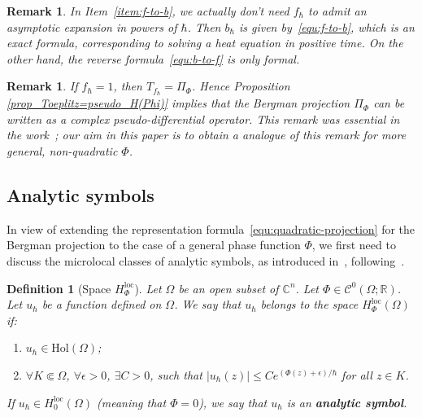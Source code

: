 \documentclass{article}
\newtheorem{defi}[theo]{Definition}
\newtheorem{remark}[theo]{Remark}
\newcommand{\Hol}{\mathrm{Hol}}
\newcommand{\loc}{\mathrm{loc}}
\newcommand{\CM}{\mathbb{C}}
\newcommand{\h}{\hbar}
\begin{document}
\begin{remark}
  In Item~\ref{item:f-to-b}, we actually don't need $f_\h$ to admit an
  asymptotic expansion in powers of $\h$. Then $b_\h$ is given
  by~\eqref{equ:f-to-b}, which is an exact formula, corresponding to
  solving a heat equation in positive time. On the other hand, the
  reverse formula~\eqref{equ:b-to-f} is only formal.
\end{remark}
\begin{remark}
  If $f_{\hbar} = 1$, then $T_{f_{\hbar}} = \Pi_{\Phi}$.  Hence
  Proposition \ref{prop_Toeplitz=pseudo_H(Phi)} implies that the
  Bergman projection $\Pi_{\Phi}$ can be written as a complex
  pseudo-differential operator. This remark was essential in the
  work~\cite{rouby-17}; our aim in this paper is to obtain a analogue
  of this remark for more general, non-quadratic $\Phi$.
\end{remark}



\subsection{Analytic symbols}

In view of extending the representation
formula~\eqref{equ:quadratic-projection} for the Bergman projection to
the case of a general phase function $\Phi$, we first need to discuss
the microlocal classes of analytic symbols, as introduced
in~\cite{sj-asterisque-82}, following~\cite{boutet-kree-67}.

\begin{defi}[Space $H^{\loc}_{ \Phi}$]
  \label{defi:h-loc}
  Let $ \Omega$ be an open subset of $\CM^n$. Let
  $ \Phi \in \mathscr{C}^0( \Omega; \mathbb{R})$. Let $u_{ \hbar}$ be
  a function defined on $ \Omega$. We say that $u_{ \hbar}$ belongs to
  the space $H_{ \Phi}^{\loc}( \Omega)$ if:
  \begin{enumerate}
  \item $ u_{ \hbar} \in \Hol( \Omega)$;
  \item $ \forall K \Subset \Omega$, $ \forall \epsilon > 0$,
    $ \exists C > 0$, such that
    $ |u_{ \hbar}(z)| \leq C e^{(\Phi(z) + \epsilon)/ \hbar}$ for all
    $z \in K$.
  \end{enumerate}
  If $u_{ \hbar} \in H_0^{\loc}( \Omega)$ (meaning that $ \Phi = 0$),
  we say that $u_{ \hbar}$ is an \textbf{analytic symbol}.
\end{defi}
\end{document}
